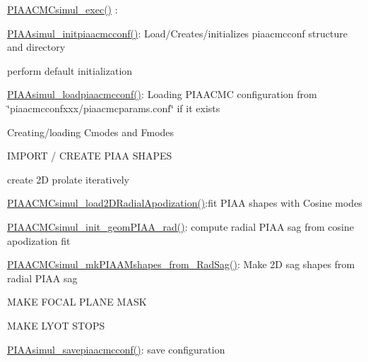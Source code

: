 \begin{DoxyItemize}
\item \hyperlink{PIAACMCdesign_2src_2PIAACMCsimul_2PIAACMCsimul_8c_a1083c078214e43d74447950f8a236c5d}{P\+I\+A\+A\+C\+M\+Csimul\+\_\+exec()} \+:
\begin{DoxyItemize}
\item \hyperlink{PIAACMCdesign_2src_2PIAACMCsimul_2PIAACMCsimul_8c_a85f1459cf776292b7e2fff9932a79252}{P\+I\+A\+Asimul\+\_\+initpiaacmcconf()}\+: Load/\+Creates/initializes piaacmcconf structure and directory
\begin{DoxyItemize}
\item perform default initialization
\item \hyperlink{PIAACMCdesign_2src_2PIAACMCsimul_2PIAACMCsimul_8c_adedec73128f41e8b3f83796bf913c8da}{P\+I\+A\+Asimul\+\_\+loadpiaacmcconf()}\+: Loading P\+I\+A\+A\+C\+M\+C configuration from \char`\"{}piaacmcconfxxx/piaacmcparams.\+conf\char`\"{} if it exists
\item Creating/loading Cmodes and Fmodes
\item I\+M\+P\+O\+R\+T / C\+R\+E\+A\+T\+E P\+I\+A\+A S\+H\+A\+P\+E\+S
\begin{DoxyItemize}
\item create 2\+D prolate iteratively
\item \hyperlink{PIAACMCdesign_2src_2PIAACMCsimul_2PIAACMCsimul_8c_a6828d3577dee2b0882bd7df99602f30d}{P\+I\+A\+A\+C\+M\+Csimul\+\_\+load2\+D\+Radial\+Apodization()}\+:fit P\+I\+A\+A shapes with Cosine modes
\item \hyperlink{PIAACMCdesign_2src_2PIAACMCsimul_2PIAACMCsimul_8c_a8e2b36e622c11627571989ab113d85eb}{P\+I\+A\+A\+C\+M\+Csimul\+\_\+init\+\_\+geom\+P\+I\+A\+A\+\_\+rad()}\+: compute radial P\+I\+A\+A sag from cosine apodization fit
\item \hyperlink{PIAACMCdesign_2src_2PIAACMCsimul_2PIAACMCsimul_8c_adad6ba0da7cd47c07c35232b6096fa1c}{P\+I\+A\+A\+C\+M\+Csimul\+\_\+mk\+P\+I\+A\+A\+Mshapes\+\_\+from\+\_\+\+Rad\+Sag()}\+: Make 2\+D sag shapes from radial P\+I\+A\+A sag
\end{DoxyItemize}
\item M\+A\+K\+E F\+O\+C\+A\+L P\+L\+A\+N\+E M\+A\+S\+K
\item M\+A\+K\+E L\+Y\+O\+T S\+T\+O\+P\+S
\item \hyperlink{PIAACMCdesign_2src_2PIAACMCsimul_2PIAACMCsimul_8c_aac928f8658448934caa7e805af8606a8}{P\+I\+A\+Asimul\+\_\+savepiaacmcconf()}\+: save configuration
\end{DoxyItemize}

\end{DoxyItemize}
\end{DoxyItemize}
